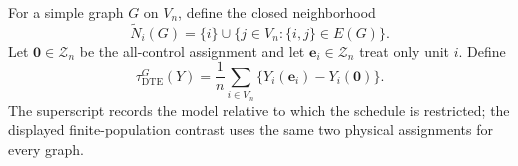 For a simple graph \(G\) on \(V_n\), define the closed neighborhood
\[
\widetilde N_i(G)=\{i\}\cup\{j\in V_n:\{i,j\}\in E(G)\}.
\]
Let \(\mathbf 0\in\mathcal Z_n\) be the all-control assignment and let \(\mathbf e_i\in\mathcal Z_n\) treat only unit \(i\). Define
\[
\tau_{\mathrm{DTE}}^G(Y)
=\frac1n\sum_{i\in V_n}\{Y_i(\mathbf e_i)-Y_i(\mathbf 0)\}.
\]
The superscript records the model relative to which the schedule is restricted; the displayed finite-population contrast uses the same two physical assignments for every graph.